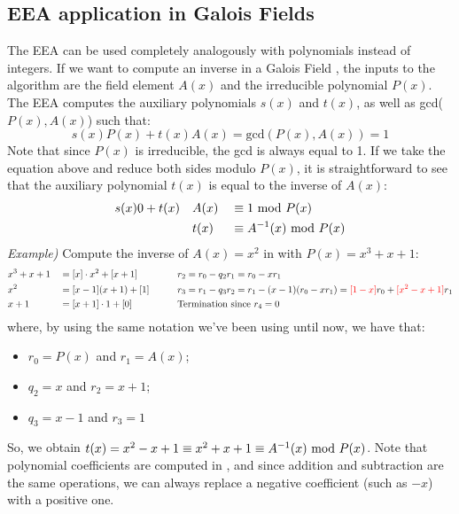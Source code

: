 \subsection{EEA application in Galois Fields}
The EEA can be used completely analogously with polynomials instead of integers. If we want to compute an inverse in a Galois Field , the inputs to the algorithm are the field element $A(x)$ and the irreducible polynomial $P(x)$. The EEA computes the auxiliary polynomials $s(x)$ and $t(x)$, as well as gcd($P(x),A(x)$) such that:
$$s(x)P(x)+t(x)A(x)=\text{gcd}(P(x),A(x))=1$$
Note that since $P(x)$ is irreducible, the gcd is always equal to 1. If we take the equation above and reduce both sides modulo $P(x)$, it is straightforward to see that the auxiliary polynomial $t(x)$ is equal to the inverse of $A(x)$:
\begin{alignat*}{3}
    &s(x)0+t(x)&&A(x)&&\equiv 1\text{ mod } P(x)\\
    &&&t(x)&&\equiv A^{-1}(x)\text{ mod } P(x)
\end{alignat*}
\textit{Example)} Compute the inverse of $A(x)=x^2$ in  with $P(x)=x^3+x+1$:
\begin{alignat*}{3}
    &x^3+x+1&&=[x]\cdot x^2+[x+1]\qquad &&r_2=r_0-q_2r_1=r_0-xr_1\\
    &x^2&&=[x-1](x+1)+[1]\qquad &&r_3=r_1-q_3r_2=r_1-(x-1)(r_0-xr_1)=\textcolor{red}{[1-x]}r_0+\textcolor{red}{[x^2-x+1]}r_1\\
    &x+1&&=[x+1]\cdot1+[0]\qquad&&\text{Termination since $r_4=0$}
\end{alignat*}
where, by using the same notation we've been using until now, we have that:
\begin{itemize}
    \item $r_0=P(x)$ and $r_1=A(x)$;
    \item $q_2=x$ and $r_2=x+1$;
    \item $q_3=x-1$ and $r_3=1$
\end{itemize}
So, we obtain $t(x)=x^2-x+1\equiv x^2+x+1\equiv A^{-1}(x)\text{ mod } P(x)$. Note that polynomial coefficients are computed in , and since addition and subtraction are the same operations, we can always replace a negative coefficient (such as $-x$) with a positive one.

\newpage
